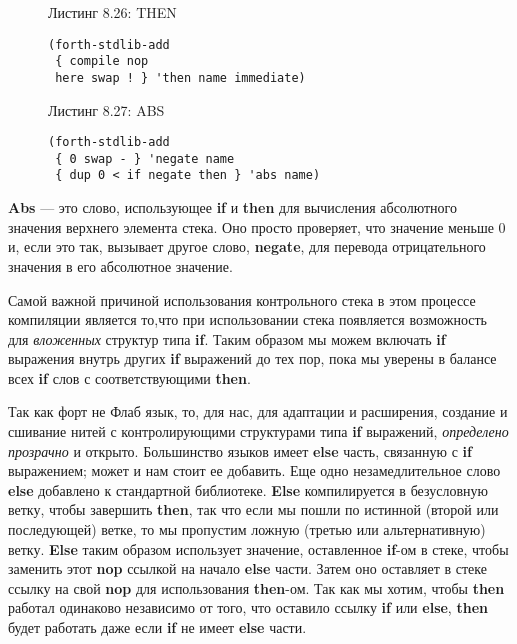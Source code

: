 \begin{figure}Листинг 8.26: THEN\label{listing_8.26}
\listbegin
\begin{verbatim}
(forth-stdlib-add
 { compile nop
 here swap ! } 'then name immediate)
\end{verbatim}
\listend
\end{figure}


\begin{figure}Листинг 8.27: ABS\label{listing_8.27}
\listbegin
\begin{verbatim}
(forth-stdlib-add
 { 0 swap - } 'negate name
 { dup 0 < if negate then } 'abs name)
\end{verbatim}
\listend
\end{figure}

\textbf{Abs} --- это слово, использующее \textbf{if} и \textbf{then} для вычисления абсолютного значения верхнего элемента стека. Оно просто проверяет, что значение меньше 0 и, если это так, вызывает другое слово, \textbf{negate}, для перевода отрицательного значения в его абсолютное значение.

Самой важной причиной использования контрольного стека в этом процессе компиляции является то,что при использовании стека появляется возможность для \emph{вложенных} структур типа \textbf{if}. Таким образом мы можем включать \textbf{if} выражения внутрь других \textbf{if} выражений до тех пор, пока мы уверены в балансе всех \textbf{if} слов с соответствующими \textbf{then}.

Так как форт не Флаб язык, то, для нас, для адаптации и расширения, создание и сшивание нитей с контролирующими структурами типа \textbf{if} выражений, \emph{определено прозрачно} и открыто. Большинство языков имеет \textbf{else} часть, связанную с \textbf{if} выражением; может и нам стоит ее добавить. Еще одно незамедлительное слово \textbf{else} добавлено к стандартной библиотеке. \textbf{Else} компилируется в безусловную ветку, чтобы завершить \textbf{then}, так что если мы пошли по истинной (второй или последующей) ветке, то мы пропустим ложную (третью или альтернативную) ветку. \textbf{Else} таким образом использует значение, оставленное \textbf{if}-ом в стеке, чтобы заменить этот \textbf{nop} ссылкой на начало \textbf{else} части. Затем оно оставляет в стеке ссылку на свой \textbf{nop} для использования \textbf{then}-ом. Так как мы хотим, чтобы \textbf{then} работал одинаково независимо от того, что оставило ссылку \textbf{if} или \textbf{else}, \textbf{then} будет работать даже если \textbf{if} не имеет \textbf{else} части.

